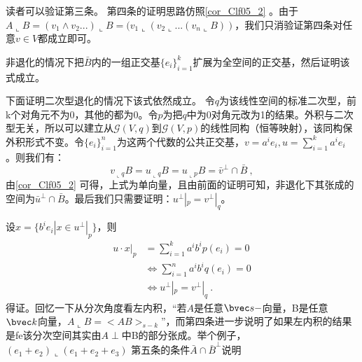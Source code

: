 读者可以验证第三条。
第四条的证明思路仿照\autoref{cor_Clf05_2} 。由于$A\llcorner B=(v_1\wedge v_2...)\llcorner B=(v_1\llcorner (v_2\llcorner...(v_n\llcorner B))$，我们只消验证第四条对任意$v\in V$都成立即可。

非退化的情况下把$\bar B$内的一组正交基$\{e_i\}^k_{i=1}$扩展为全空间的正交基，然后证明该式成立。

下面证明二次型退化的情况下该式依然成立。
令$q$为该线性空间的标准二次型，前k个对角元不为0，其他的都为0。令$p$为把$q$中为0对角元改为1的结果。外积与二次型无关，所以可以建立从$\mathcal G(V,q)$到$\mathcal G(V,p)$的线性同构（恒等映射），该同构保外积形式不变。令$\{e_i\}^n_{i=1}$为这两个代数的公共正交基，$v=a^ie_i,u=\sum \limits ^k_{i=1}a^ie_i$ 。则我们有：
\begin{equation}
v_{\llcorner q} B=u_{\llcorner q}B=u_{\llcorner p}B=\bar{v}^{\perp} \cap \bar{B}~,
\end{equation}
由\autoref{cor_Clf05_2} 可得，上式为单向量，且由前面的证明可知，非退化下其张成的空间为$\bar u^{\perp}\cap\bar B$。最后我们只需要证明：$u^{\perp}|_p=v^{\perp}|_q$。

设$x=\{b^ie_i|x\in u^{\perp}|_p\}$，则
\begin{equation}
\begin{aligned}
u\cdot x|_p&=\sum \limits^k_{i=1}a^i b^i p(e_i)=0\\
& \Leftrightarrow \sum \limits^n_{i=1}a^i b^i q(e_i)=0\\
& \Leftrightarrow u^{\perp}|_p=v^{\perp}|_q~.
\end{aligned}
\end{equation}
得证。回忆一下从分次角度看左内积，“若$A$是任意$\bvec s-$向量，B是任意$\bvec k$向量，$A\llcorner B=<AB>_{s-k}$”，而第四条进一步说明了如果左内积的结果是fe该分次空间其实由$A\perp$中B的部分张成。举个例子，$(e_1+e_2)\llcorner (e_1+e_2+e_3)$
第五条的条件$\bar A \cap \bar B^{\perp}$说明